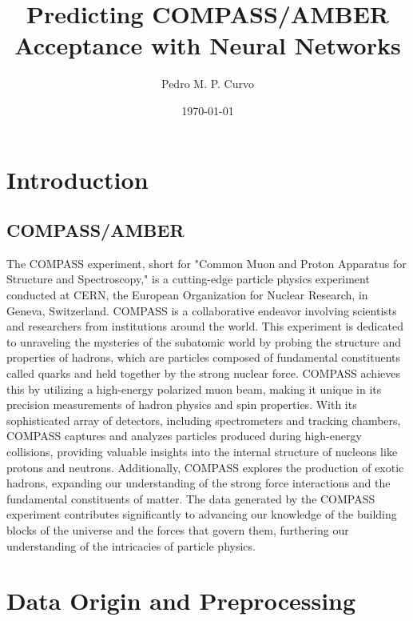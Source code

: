 \documentclass{article}
\title{Predicting COMPASS/AMBER Acceptance with Neural Networks}
\author{Pedro M. P. Curvo}
\date{\today}
\begin{document}
\maketitle

\section{Introduction}

\subsection{COMPASS/AMBER}

The COMPASS experiment, short for "Common Muon and Proton Apparatus for Structure 
and Spectroscopy," is a cutting-edge particle physics experiment conducted at CERN, 
the European Organization for Nuclear Research, in Geneva, Switzerland. COMPASS is a 
collaborative endeavor involving scientists and researchers from institutions around the world.
This experiment is dedicated to unraveling the mysteries of the subatomic world by probing the 
structure and properties of hadrons, which are particles composed of fundamental constituents 
called quarks and held together by the strong nuclear force. COMPASS achieves this by utilizing 
a high-energy polarized muon beam, making it unique in its precision measurements of hadron 
physics and spin properties.
With its sophisticated array of detectors, including spectrometers and tracking chambers, 
COMPASS captures and analyzes particles produced during high-energy collisions, providing 
valuable insights into the internal structure of nucleons like protons and neutrons. 
Additionally, COMPASS explores the production of exotic hadrons, expanding our understanding 
of the strong force interactions and the fundamental constituents of matter.
The data generated by the COMPASS experiment contributes significantly to advancing our 
knowledge of the building blocks of the universe and the forces that govern them, 
furthering our understanding of the intricacies of particle physics.


\section{Data Origin and Preprocessing}
\end{document}
